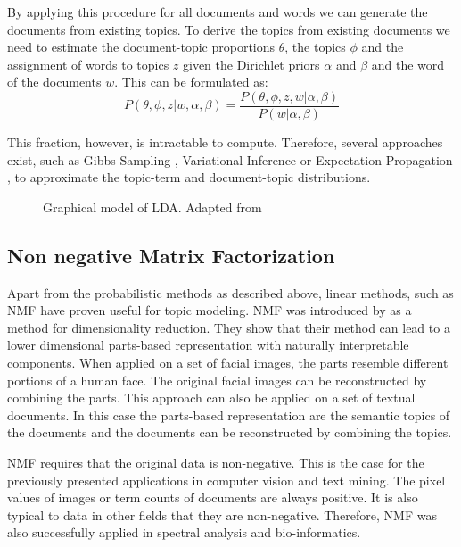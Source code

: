 By applying this procedure for all documents and words we can generate the documents from existing topics. To derive the topics from existing documents we need to estimate the document-topic proportions $\theta$, the topics $\phi$ and the assignment of words to topics $z$ given the Dirichlet priors $\alpha$ and $\beta$ and the word of the documents $w$. This can be formulated as:
\begin{equation}
P(\theta, \phi, z| w, \alpha, \beta) = \frac{P(\theta, \phi, z, w |\alpha, \beta)}{P(w |\alpha, \beta)} 
\end{equation}

This fraction, however, is intractable to compute. Therefore, several approaches exist, such as Gibbs Sampling \citep{Griffiths2002}, Variational Inference \citep{Blei2003} or Expectation Propagation \citep{Minka2002}, to approximate the topic-term and document-topic distributions.

\begin{figure}
	
	\caption[Graphical model of LDA]{Graphical model of LDA. Adapted from \cite{Widmer2018}}
	\label{fig:dgmlda}
\end{figure}


\subsection{Non negative Matrix Factorization}

Apart from the probabilistic methods as described above, linear methods, such as \acl{NMF} have proven useful for topic modeling. \ac{NMF} was introduced by \cite{Lee1999} as a method for dimensionality reduction. They show that their method can lead to a lower dimensional parts-based representation with naturally interpretable components. When applied on a set of facial images, the parts resemble different portions of a human face. The original facial images can be reconstructed by combining the parts. This approach can also be applied on a set of textual documents. In this case the parts-based representation are the semantic topics of the documents and the documents can be reconstructed by combining the topics.

\ac{NMF} requires that the original data is non-negative. This is the case for the previously presented applications in computer vision and text mining. The pixel values of images or term counts of documents are always positive. It is also typical to data in other fields that they are non-negative. Therefore, \ac{NMF} was also successfully applied in spectral analysis \citep{Pauca2006} and bio-informatics\citep{Brunet2004}.


